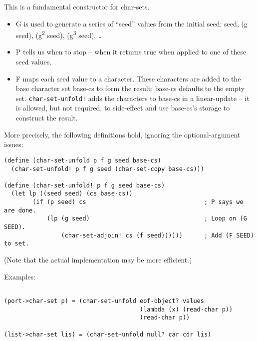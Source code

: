 \begin{entry}{%
  }

This is a fundamental constructor for char-sets.

\begin{itemize}
  \tightlist
\item G is used to generate a series of ``seed'' values from the
  initial seed: seed, (g seed), (g\textsuperscript{2} seed),
  (g\textsuperscript{3} seed), \ldots{}
\item P tells us when to stop -- when it returns true when applied to
  one of these seed values.
\item F maps each seed value to a character. These characters are
  added to the base character set base-cs to form the result; base-cs
  defaults to the empty set. \texttt{char-set-unfold!} adds the
  characters to base-cs in a linear-update -- it is allowed, but not
  required, to side-effect and use base-cs's storage to construct the
  result.
\end{itemize}

More precisely, the following definitions hold, ignoring the
optional-argument issues:

\begin{verbatim}
(define (char-set-unfold p f g seed base-cs) 
  (char-set-unfold! p f g seed (char-set-copy base-cs)))

(define (char-set-unfold! p f g seed base-cs)
  (let lp ((seed seed) (cs base-cs))
        (if (p seed) cs                                 ; P says we are done.
            (lp (g seed)                                ; Loop on (G SEED).
                (char-set-adjoin! cs (f seed))))))      ; Add (F SEED) to set.
\end{verbatim}

(Note that the actual implementation may be more efficient.)

Examples:

\begin{verbatim}
                         
(port->char-set p) = (char-set-unfold eof-object? values
                                      (lambda (x) (read-char p))
                                      (read-char p))

(list->char-set lis) = (char-set-unfold null? car cdr lis)
\end{verbatim}
\end{entry}
